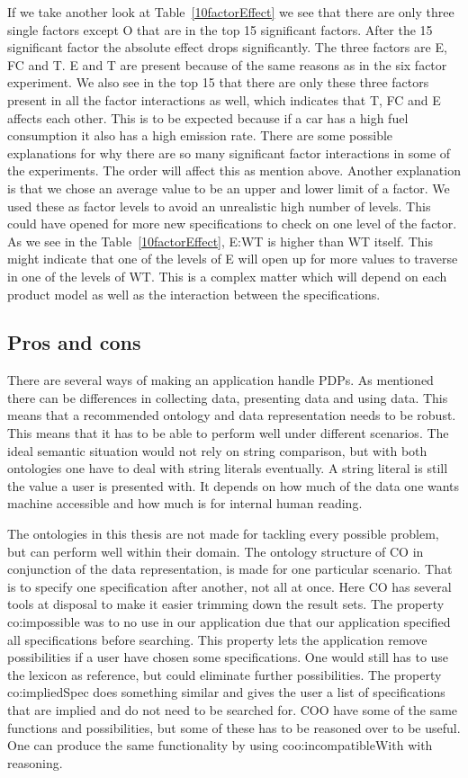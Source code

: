 \documentclass{llncs}
\begin{document}
If we take another look at Table~\ref{10factorEffect} we see that
there are only three single factors except O that are in the top 15
significant factors.  After the 15 significant factor the absolute
effect drops significantly. The three factors are E, FC and T. E and T
are present because of the same reasons as in the six factor
experiment. We also see in the top 15 that there are only these three
factors present in all the factor interactions as well, which
indicates that T, FC and E affects each other. This is to be expected
because if a car has a high fuel consumption it also has a high
emission rate. There are some possible explanations for why there are
so many significant factor interactions in some of the
experiments. The order will affect this as mention above. Another
explanation is that we chose an average value to be an upper and lower
limit of a factor. We used these as factor levels to avoid an
unrealistic high number of levels. This could have opened for more new
specifications to check on one level of the factor.  As we see in the
Table~\ref{10factorEffect}, \textsf{E:WT} is higher than \textsf{WT}
itself. This might indicate that one of the levels of E will open up
for more values to traverse in one of the levels of WT. This is a
complex matter which will depend on each product model as well as the
interaction between the specifications.

\subsection{Pros and cons}
There are several ways of making an application handle PDPs. As
mentioned there can be differences in collecting data, presenting data
and using data. This means that a recommended ontology and data
representation needs to be robust. This means that it has to be able
to perform well under different scenarios.  The ideal semantic
situation would not rely on string comparison, but with both
ontologies one have to deal with string literals eventually. A string
literal is still the value a user is presented with.  It depends on
how much of the data one wants machine accessible and how much is for
internal human reading.

The ontologies in this thesis are not made for tackling every possible
problem, but can perform well within their domain. The ontology
structure of CO in conjunction of the data representation, is made for
one particular scenario. That is to specify one specification after
another, not all at once. Here CO has several tools at disposal to
make it easier trimming down the result sets. The property
\textsf{co:impossible} was to no use in our application due that our
application specified all specifications before searching. This
property lets the application remove possibilities if a user have
chosen some specifications. One would still has to use the lexicon as
reference, but could eliminate further possibilities. The property
\textsf{co:impliedSpec} does something similar and gives the user a
list of specifications that are implied and do not need to be searched
for.  COO have some of the same functions and possibilities, but some
of these has to be reasoned over to be useful. One can produce the
same functionality by using \textsf{coo:incompatibleWith} with
reasoning.
\end{document}

